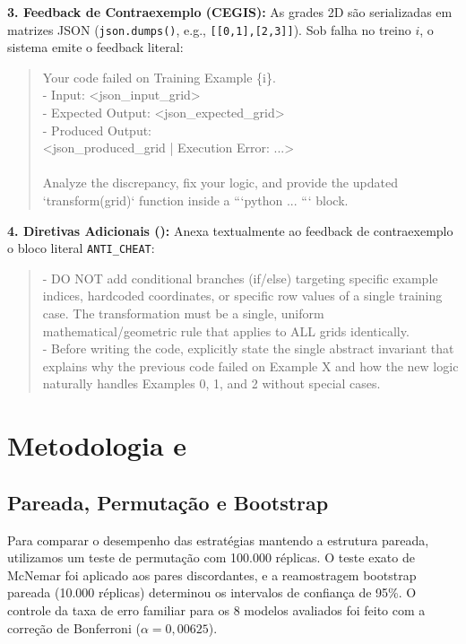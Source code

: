 \documentclass[letterpaper]{article} %
\begin{document}
\noindent\textbf{3. Feedback de Contraexemplo (CEGIS):}
As grades 2D s{\~a}o serializadas em matrizes JSON (\texttt{json.dumps()}, e.g., \texttt{[[0,1],[2,3]]}). Sob falha no treino $i$, o sistema emite o feedback literal:
\begin{quote}\footnotesize\ttfamily\raggedright\setlength{\topsep}{1.5pt}\setlength{\partopsep}{0pt}
Your code failed on Training Example \{i\}.\\
- Input: <json\_input\_grid>\\
- Expected Output: <json\_expected\_grid>\\
- Produced Output:\\
  <json\_produced\_grid | Execution Error: ...>\\ \\
Analyze the discrepancy, fix your logic, and provide the updated `transform(grid)` function inside a ```python ... ``` block.
\end{quote}

\noindent\textbf{4. Diretivas Adicionais (\AntiTrapaca{}):}
Anexa textualmente ao feedback de contraexemplo o bloco literal \texttt{ANTI\_CHEAT}:
\begin{quote}\footnotesize\ttfamily\raggedright\setlength{\topsep}{1.5pt}\setlength{\partopsep}{0pt}
- DO NOT add conditional branches (if/else) targeting specific example indices, hardcoded coordinates, or specific row values of a single training case. The transformation must be a single, uniform mathematical/geometric rule that applies to ALL grids identically.\\
- Before writing the code, explicitly state the single abstract invariant that explains why the previous code failed on Example X and how the new logic naturally handles Examples 0, 1, and 2 without special cases.
\end{quote}

\section{Metodologia e \Fundamentacao{} \Estatistica{}}
\label{sec:estatistica}
\subsection{\Analise{} Pareada, Permuta{\c{c}}{\~a}o e Bootstrap}
Para comparar o desempenho das estratégias mantendo a estrutura pareada, utilizamos um teste de permutação com 100.000 réplicas. O teste exato de McNemar foi aplicado aos pares discordantes, e a reamostragem bootstrap pareada (10.000 réplicas) determinou os intervalos de confiança de 95\%. O controle da taxa de erro familiar para os 8 modelos avaliados foi feito com a correção de Bonferroni ($\alpha = 0,00625$).
\end{document}
